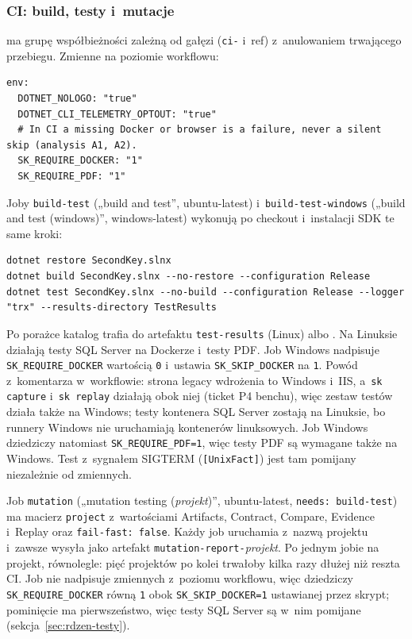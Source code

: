 \subsubsection{CI: build, testy i~mutacje}

 ma grupę współbieżności zależną od gałęzi (\texttt{ci-} i~ref) z~anulowaniem
trwającego przebiegu. Zmienne na poziomie workflowu:

\begin{lstlisting}
env:
  DOTNET_NOLOGO: "true"
  DOTNET_CLI_TELEMETRY_OPTOUT: "true"
  # In CI a missing Docker or browser is a failure, never a silent skip (analysis A1, A2).
  SK_REQUIRE_DOCKER: "1"
  SK_REQUIRE_PDF: "1"
\end{lstlisting}

Joby \texttt{build-test} („build and test”, ubuntu-latest) i~\texttt{build-test-windows}
(„build and test (windows)”, windows-latest) wykonują po checkout i~instalacji SDK te same
kroki:

\begin{lstlisting}
dotnet restore SecondKey.slnx
dotnet build SecondKey.slnx --no-restore --configuration Release
dotnet test SecondKey.slnx --no-build --configuration Release --logger "trx" --results-directory TestResults
\end{lstlisting}

Po porażce katalog  trafia do artefaktu \texttt{test-results} (Linux) albo
. Na Linuksie działają testy SQL Server na Dockerze i~testy PDF.
Job Windows nadpisuje \texttt{SK\_REQUIRE\_DOCKER} wartością \texttt{0} i~ustawia
\texttt{SK\_SKIP\_DOCKER} na \texttt{1}. Powód z~komentarza w~workflowie: strona legacy
wdrożenia to Windows i~IIS, a~\texttt{sk capture} i~\texttt{sk replay} działają obok niej
(ticket P4 benchu), więc zestaw testów działa także na Windows; testy kontenera SQL Server
zostają na Linuksie, bo runnery Windows nie uruchamiają kontenerów linuksowych. Job Windows
dziedziczy natomiast \texttt{SK\_REQUIRE\_PDF=1}, więc testy PDF są wymagane także na
Windows. Test z~sygnałem SIGTERM (\texttt{[UnixFact]}) jest tam pomijany niezależnie od
zmiennych.

Job \texttt{mutation} („mutation testing (\emph{projekt})”, ubuntu-latest,
\texttt{needs: build-test}) ma macierz \texttt{project} z~wartościami Artifacts, Contract,
Compare, Evidence i~Replay oraz \texttt{fail-fast: false}. Każdy job uruchamia
 z~nazwą projektu i~zawsze wysyła  jako
artefakt \texttt{mutation-report-}\emph{projekt}. Po jednym jobie na projekt, równolegle:
pięć projektów po kolei trwałoby kilka razy dłużej niż reszta CI. Job nie nadpisuje zmiennych
z~poziomu workflowu, więc dziedziczy \texttt{SK\_REQUIRE\_DOCKER} równą \texttt{1} obok
\texttt{SK\_SKIP\_DOCKER=1} ustawianej przez skrypt; pominięcie ma pierwszeństwo, więc
testy SQL Server są w~nim pomijane (sekcja~\ref{sec:rdzen-testy}).

